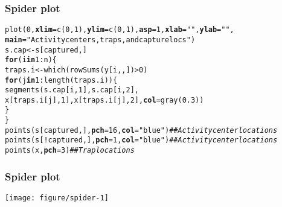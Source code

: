 \documentclass[color=usenames,dvipsnames]{beamer}\usepackage[]{graphicx}\usepackage[]{xcolor}
\makeatletter
\newcommand{\hlnum}[1]{\textcolor[rgb]{0.69,0.494,0}{#1}}%
\newcommand{\hlsng}[1]{\textcolor[rgb]{0.749,0.012,0.012}{#1}}%
\newcommand{\hlcom}[1]{\textcolor[rgb]{0.514,0.506,0.514}{\textit{#1}}}%
\newcommand{\hlopt}[1]{\textcolor[rgb]{0,0,0}{#1}}%
\newcommand{\hldef}[1]{\textcolor[rgb]{0,0,0}{#1}}%
\newcommand{\hlkwa}[1]{\textcolor[rgb]{0,0,0}{\textbf{#1}}}%
\newcommand{\hlkwb}[1]{\textcolor[rgb]{0,0.341,0.682}{#1}}%
\newcommand{\hlkwc}[1]{\textcolor[rgb]{0,0,0}{\textbf{#1}}}%
\newcommand{\hlkwd}[1]{\textcolor[rgb]{0.004,0.004,0.506}{#1}}%
\newenvironment{kframe}{%
 \def\at@end@of@kframe{}%
 \ifinner\ifhmode%
  \def\at@end@of@kframe{\end{minipage}}%
  \begin{minipage}{\columnwidth}%
 \fi\fi%
 \def\FrameCommand##1{\hskip\@totalleftmargin \hskip-\fboxsep
 \colorbox{shadecolor}{##1}\hskip-\fboxsep
     \hskip-\linewidth \hskip-\@totalleftmargin \hskip\columnwidth}%
 \MakeFramed {\advance\hsize-\width
   \@totalleftmargin\z@ \linewidth\hsize
   \@setminipage}}%
 {\par\unskip\endMakeFramed%
 \at@end@of@kframe}
\newenvironment{knitrout}{}{} %
\makeatother
\begin{document}
\begin{frame}[fragile]
  \frametitle{Spider plot}
\begin{knitrout}\scriptsize
{}\color{fgcolor}\begin{kframe}
\begin{alltt}
\hlkwd{plot}\hldef{(}\hlnum{0}\hldef{,} \hlkwc{xlim}\hldef{=}\hlkwd{c}\hldef{(}\hlnum{0}\hldef{,}\hlnum{1}\hldef{),} \hlkwc{ylim}\hldef{=}\hlkwd{c}\hldef{(}\hlnum{0}\hldef{,}\hlnum{1}\hldef{),} \hlkwc{asp}\hldef{=}\hlnum{1}\hldef{,} \hlkwc{xlab}\hldef{=}\hlsng{""}\hldef{,} \hlkwc{ylab}\hldef{=}\hlsng{""}\hldef{,}
     \hlkwc{main}\hldef{=}\hlsng{"Activity centers, traps, and capture locs"}\hldef{)}
\hldef{s.cap} \hlkwb{<-} \hldef{s[captured,]}
\hlkwa{for}\hldef{(i} \hlkwa{in} \hlnum{1}\hlopt{:}\hldef{n) \{}
    \hldef{traps.i} \hlkwb{<-} \hlkwd{which}\hldef{(}\hlkwd{rowSums}\hldef{(y[i,,])}\hlopt{>}\hlnum{0}\hldef{)}
    \hlkwa{for}\hldef{(j} \hlkwa{in} \hlnum{1}\hlopt{:}\hlkwd{length}\hldef{(traps.i)) \{}
        \hlkwd{segments}\hldef{(s.cap[i,}\hlnum{1}\hldef{], s.cap[i,}\hlnum{2}\hldef{],}
                 \hldef{x[traps.i[j],}\hlnum{1}\hldef{], x[traps.i[j],}\hlnum{2}\hldef{],} \hlkwc{col}\hldef{=}\hlkwd{gray}\hldef{(}\hlnum{0.3}\hldef{))}
    \hldef{\}}
\hldef{\}}
\hlkwd{points}\hldef{(s[captured,],} \hlkwc{pch}\hldef{=}\hlnum{16}\hldef{,} \hlkwc{col}\hldef{=}\hlsng{"blue"}\hldef{)} \hlcom{## Activity center locations}
\hlkwd{points}\hldef{(s[}\hlopt{!}\hldef{captured,],} \hlkwc{pch}\hldef{=}\hlnum{1}\hldef{,} \hlkwc{col}\hldef{=}\hlsng{"blue"}\hldef{)} \hlcom{## Activity center locations}
\hlkwd{points}\hldef{(x,} \hlkwc{pch}\hldef{=}\hlnum{3}\hldef{)}                         \hlcom{## Trap locations}
\end{alltt}
\end{kframe}
\end{knitrout}
\end{frame}


\begin{frame}
  \frametitle{Spider plot}
  \centering
  \texttt{[image: figure/spider-1]} \\
\end{frame}
\end{document}
